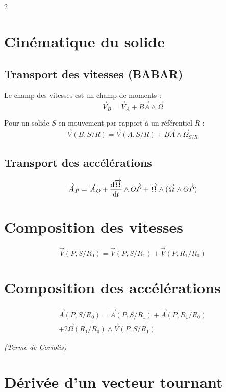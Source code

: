 \documentclass[10pt,a4paper]{article}
\renewcommand{\vec}{\overrightarrow}
\begin{document}
\begin{multicols}{2}
    \section{Cinématique du solide}

        \subsection*{Transport des vitesses (BABAR)}
        Le champ des vitesses est un champ de moments :
        \[
        \vec V_B = \vec V_A + \vec{BA} \wedge \vec\Omega
        \]

        Pour un solide $S$ en mouvement par rapport à un référentiel $R$ :
        \[
        \vec V(B, S/R) = \vec V(A, S/R) + \vec{BA} \wedge \vec\Omega_{S/R}
        \]


        \subsection*{Transport des accélérations}
        \[
        \vec A_P =
        \vec A_O
        + \dv{\vec\Omega}{t} \wedge \vec{OP}
        + \vec\Omega \wedge (\vec\Omega \wedge \vec{OP})
        \]

    \section{Composition des vitesses}

        \[
        \vec V(P, S/R_0)
        =
        \vec V(P, S/R_1)
        +
        \vec V(P, R_1/R_0)
        \]

    \section{Composition des accélérations}

        \begin{align*}  
            \vec A(P, S/R_0) = \vec A(P, S/R_1) + \vec A(P, R_1/R_0) \\
                                + 2 \vec\Omega(R_1/R_0) \wedge \vec V(P, S/R_1)
        \end{align*}

        \textit{(Terme de Coriolis)}

    \section{Dérivée d'un vecteur tournant}


\end{multicols}
\end{document}
